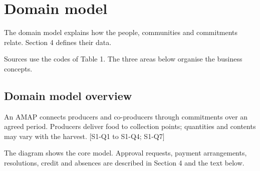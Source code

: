 \documentclass[11pt,a4paper]{article}
\begin{document}
\section{Domain model}

The domain model explains how the people, communities and commitments relate. Section 4 defines their data.

Sources use the codes of Table 1. The three areas below organise the business concepts.


\subsection{Domain model overview}

An AMAP connects producers and co-producers through commitments over an agreed period. Producers deliver food to collection points; quantities and contents may vary with the harvest. [S1-Q1 to S1-Q4; S1-Q7]

The diagram shows the core model. Approval requests, payment arrangements, resolutions, credit and absences are described in Section 4 and the text below.
\end{document}
